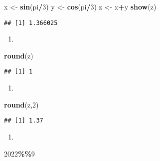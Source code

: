 \documentclass[
]{article}
\newenvironment{Shaded}{\begin{snugshade}}{\end{snugshade}}
\newcommand{\DecValTok}[1]{\textcolor[rgb]{0.00,0.00,0.81}{#1}}
\newcommand{\FunctionTok}[1]{\textcolor[rgb]{0.13,0.29,0.53}{\textbf{#1}}}
\newcommand{\NormalTok}[1]{#1}
\newcommand{\OtherTok}[1]{\textcolor[rgb]{0.56,0.35,0.01}{#1}}
\newcommand{\SpecialCharTok}[1]{\textcolor[rgb]{0.81,0.36,0.00}{\textbf{#1}}}
\providecommand{\tightlist}{%
  \setlength{\itemsep}{0pt}\setlength{\parskip}{0pt}}
\begin{document}
\begin{Shaded}
\begin{Highlighting}[]
\NormalTok{x }\OtherTok{\textless{}{-}} \FunctionTok{sin}\NormalTok{(pi}\SpecialCharTok{/}\DecValTok{3}\NormalTok{)}
\NormalTok{y }\OtherTok{\textless{}{-}} \FunctionTok{cos}\NormalTok{(pi}\SpecialCharTok{/}\DecValTok{3}\NormalTok{)}
\NormalTok{z }\OtherTok{\textless{}{-}}\NormalTok{ x}\SpecialCharTok{+}\NormalTok{y}
\FunctionTok{show}\NormalTok{(z)}
\end{Highlighting}
\end{Shaded}

\begin{verbatim}
## [1] 1.366025
\end{verbatim}

\begin{enumerate}
\def\labelenumi{\arabic{enumi})}
\setcounter{enumi}{2}
\tightlist
\item
\end{enumerate}

\begin{Shaded}
\begin{Highlighting}[]
\FunctionTok{round}\NormalTok{(z)}
\end{Highlighting}
\end{Shaded}

\begin{verbatim}
## [1] 1
\end{verbatim}

\begin{enumerate}
\def\labelenumi{\arabic{enumi})}
\setcounter{enumi}{3}
\tightlist
\item
\end{enumerate}

\begin{Shaded}
\begin{Highlighting}[]
\FunctionTok{round}\NormalTok{(z,}\DecValTok{2}\NormalTok{)}
\end{Highlighting}
\end{Shaded}

\begin{verbatim}
## [1] 1.37
\end{verbatim}

\begin{enumerate}
\def\labelenumi{\arabic{enumi})}
\setcounter{enumi}{4}
\tightlist
\item
\end{enumerate}

\begin{Shaded}
\begin{Highlighting}[]
\DecValTok{2022}\SpecialCharTok{\%\%}\DecValTok{9}
\end{Highlighting}
\end{Shaded}
\end{document}
